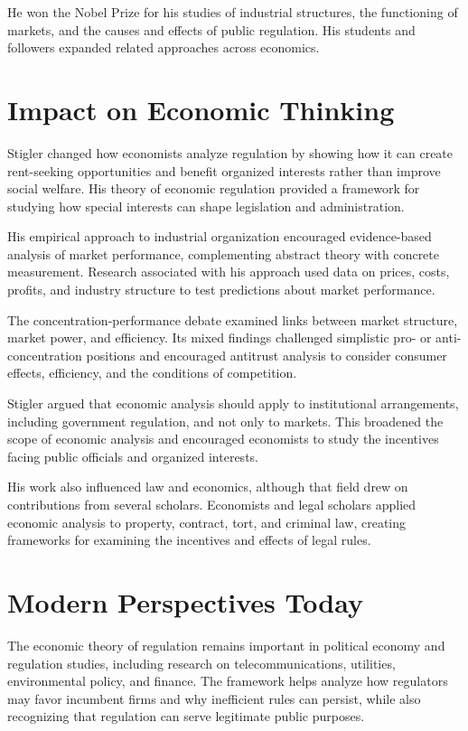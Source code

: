 He won the Nobel Prize for his studies of industrial structures, the
functioning of markets, and the causes and effects of public regulation. His
students and followers expanded related approaches across economics.

\section{Impact on Economic Thinking}
Stigler changed how economists analyze regulation by showing how it can create
rent-seeking opportunities and benefit organized interests rather than improve
social welfare. His theory of economic regulation provided a framework for
studying how special interests can shape legislation and administration.

His empirical approach to industrial organization encouraged evidence-based
analysis of market performance, complementing abstract theory with concrete
measurement. Research associated with his approach used data on prices, costs,
profits, and industry structure to test predictions about market performance.

The concentration-performance debate examined links between market structure,
market power, and efficiency. Its mixed findings challenged simplistic
pro- or anti-concentration positions and encouraged antitrust analysis to
consider consumer effects, efficiency, and the conditions of competition.

Stigler argued that economic analysis should apply to institutional
arrangements, including government regulation, and not only to markets. This
broadened the scope of economic analysis and encouraged economists to study
the incentives facing public officials and organized interests.

His work also influenced law and economics, although that field drew on
contributions from several scholars. Economists and legal scholars applied
economic analysis to property, contract, tort, and criminal law, creating
frameworks for examining the incentives and effects of legal rules.

\section{Modern Perspectives Today}
The economic theory of regulation remains important in political economy and
regulation studies, including research on telecommunications, utilities,
environmental policy, and finance. The framework helps analyze how regulators
may favor incumbent firms and why inefficient rules can persist, while also
recognizing that regulation can serve legitimate public purposes.

